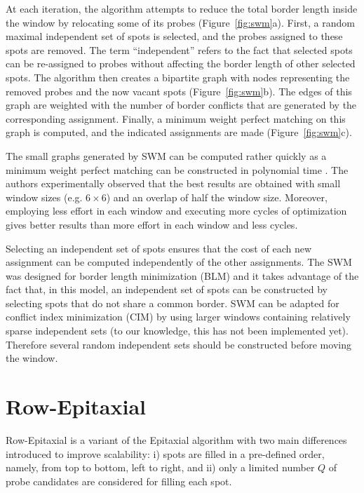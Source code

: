 At each iteration, the algorithm attempts to reduce the total border length
inside the window by relocating some of its probes (Figure~\ref{fig:swm}a).
First, a random maximal independent set of spots is selected, and the probes
assigned to these spots are removed. The term ``independent'' refers to the fact
that selected spots can be re-assigned to probes without affecting the border
length of other selected spots. The algorithm then creates a bipartite graph
with nodes representing the removed probes and the now vacant spots
(Figure~\ref{fig:swm}b). The edges of this graph are weighted with the number of
border conflicts that are generated by the corresponding assignment.  Finally, a
minimum weight perfect matching on this graph is computed, and the indicated
assignments are made (Figure~\ref{fig:swm}c).

The small graphs generated by SWM can be computed rather quickly as a minimum
weight perfect matching can be constructed in polynomial time
\citep[for a survey of algorithms, see][]{Gross2004}.
The authors experimentally observed that the best results are obtained with
small window sizes (e.g. $6\times 6$) and an overlap of half the window size.
Moreover, employing less effort in each window and executing more cycles of
optimization gives better results than more effort in each window and less
cycles.

Selecting an independent set of spots ensures that the cost of each new
assignment can be computed independently of the other assignments. The SWM was
designed for border length minimization (BLM) and it takes advantage of the fact
that, in this model, an independent set of spots can be constructed by selecting
spots that do not share a common border. SWM can be adapted for conflict index
minimization (CIM) by using larger windows containing relatively sparse
independent sets (to our knowledge, this has not been implemented yet).
Therefore several random independent sets should be constructed before moving
the window.

\section{Row-Epitaxial}
\label{sec:placement_reptx}

Row-Epitaxial \citep{Kahng2003} is a variant of the Epitaxial algorithm with two
main differences introduced to improve scalability: i) spots are filled in a
pre-defined order, namely, from top to bottom, left to right, and ii) only a
limited number $Q$ of probe candidates are considered for filling each spot.

